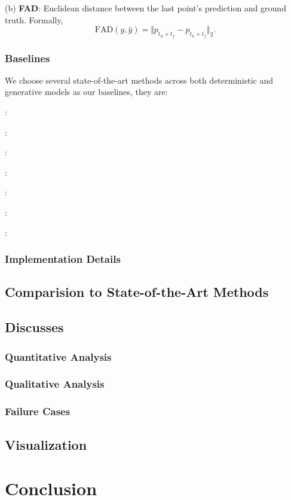 \documentclass[../paper.tex]{subfiles}
\begin{document}
(b) \textbf{FAD}:
Euclidean distance between the last point's prediction and ground truth.
Formally,
\begin{equation}
    \mbox{FAD}(y, \hat{y}) = \Vert p_{t_h + t_f} - \hat{p}_{t_h + t_f} \Vert_2.
\end{equation}

\subsubsection{Baselines}
We choose several state-of-the-art methods across both deterministic and generative models as our baselines, they are:

\textbf{\SRLSTM}:

\textbf{\TRANSFORMER}:

\textbf{\SOCIALGAN}:

\textbf{\SOPHIE}:

\textbf{\BIGAT}:

\textbf{\PEEKING}:

\textbf{\SIMAUG}:

\subsubsection{Implementation Details}

\subsection{Comparision to State-of-the-Art Methods}

\subsection{Discusses}

\subsubsection{Quantitative Analysis}

\subsubsection{Qualitative Analysis}

\subsubsection{Failure Cases}

\subsection{Visualization}


\section{Conclusion}
\end{document}
